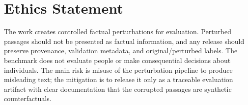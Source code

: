 \section*{Ethics Statement}

The work creates controlled factual perturbations for evaluation. Perturbed passages should not be presented as factual information, and any release should preserve provenance, validation metadata, and original/perturbed labels. The benchmark does not evaluate people or make consequential decisions about individuals. The main risk is misuse of the perturbation pipeline to produce misleading text; the mitigation is to release it only as a traceable evaluation artifact with clear documentation that the corrupted passages are synthetic counterfactuals.
